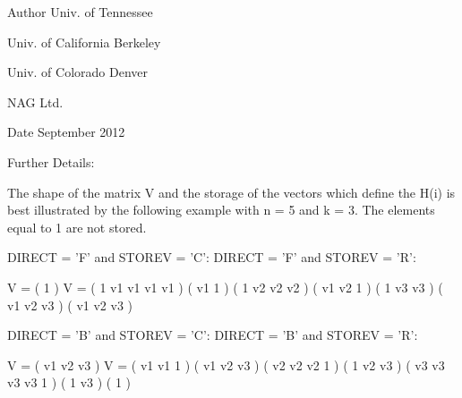 \begin{DoxyAuthor}{Author}
Univ. of Tennessee 

Univ. of California Berkeley 

Univ. of Colorado Denver 

N\+A\+G Ltd. 
\end{DoxyAuthor}
\begin{DoxyDate}{Date}
September 2012 
\end{DoxyDate}
\begin{DoxyParagraph}{Further Details\+: }
\begin{DoxyVerb}  The shape of the matrix V and the storage of the vectors which define
  the H(i) is best illustrated by the following example with n = 5 and
  k = 3. The elements equal to 1 are not stored.

  DIRECT = 'F' and STOREV = 'C':         DIRECT = 'F' and STOREV = 'R':

               V = (  1       )                 V = (  1 v1 v1 v1 v1 )
                   ( v1  1    )                     (     1 v2 v2 v2 )
                   ( v1 v2  1 )                     (        1 v3 v3 )
                   ( v1 v2 v3 )
                   ( v1 v2 v3 )

  DIRECT = 'B' and STOREV = 'C':         DIRECT = 'B' and STOREV = 'R':

               V = ( v1 v2 v3 )                 V = ( v1 v1  1       )
                   ( v1 v2 v3 )                     ( v2 v2 v2  1    )
                   (  1 v2 v3 )                     ( v3 v3 v3 v3  1 )
                   (     1 v3 )
                   (        1 )\end{DoxyVerb}
 
\end{DoxyParagraph}

